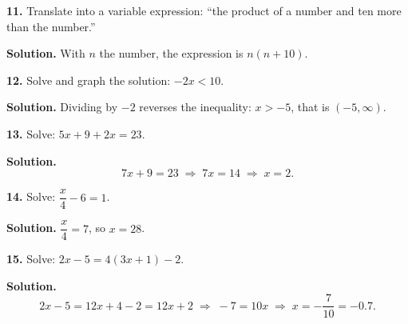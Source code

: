 \documentclass{ximera}
\begin{document}
\begin{problem}

\textbf{11.} Translate into a variable expression: ``the product of a number and ten more
than the number.''

\begin{hint}
\textbf{Solution.} With $n$ the number, the expression is $n(n+10)$.
\end{hint}
\end{problem}

\begin{problem}

\textbf{12.} Solve and graph the solution: $-2x<10$.

\begin{hint}
\textbf{Solution.} Dividing by $-2$ reverses the inequality: $x>-5$, that is
$(-5,\infty)$.
\end{hint}
\end{problem}

\begin{problem}

\textbf{13.} Solve: $5x+9+2x=23$.

\begin{hint}
\textbf{Solution.}
\[
  7x+9=23 \;\Longrightarrow\; 7x=14 \;\Longrightarrow\; x=2 .
\]
\end{hint}
\end{problem}

\begin{problem}

\textbf{14.} Solve: $\dfrac{x}{4}-6=1$.

\begin{hint}
\textbf{Solution.} $\dfrac{x}{4}=7$, so $x=28$.
\end{hint}
\end{problem}

\begin{problem}

\textbf{15.} Solve: $2x-5=4(3x+1)-2$.

\begin{hint}
\textbf{Solution.}
\[
  2x-5=12x+4-2=12x+2 \;\Longrightarrow\; -7=10x \;\Longrightarrow\; x=-\frac{7}{10}=-0.7 .
\]
\end{hint}
\end{problem}
\end{document}
